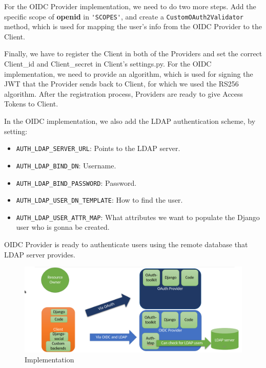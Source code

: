For the OIDC Provider implementation, we need to do two more steps. Add the specific scope of \textbf{openid} in \verb|'SCOPES'|, and create a \verb|CustomOAuth2Validator| method, which is used for mapping the user's info from the OIDC Provider to the Client. 



Finally, we have to register the Client in both of the Providers and set the correct Client\_id and Client\_secret in Client's settings.py. For the OIDC implementation, we need to provide an algorithm, which is used for signing the JWT that the Provider sends back to Client, for which we used the RS256 algorithm. After the registration process, Providers are ready to give Access Tokens to Client.

In the OIDC implementation, we also add the LDAP authentication scheme, by setting:

\begin{itemize}

	\item \verb|AUTH_LDAP_SERVER_URL|: Points to the LDAP server.

	\item \verb|AUTH_LDAP_BIND_DN|: Username.

	\item \verb|AUTH_LDAP_BIND_PASSWORD|: Password.

	\item \verb|AUTH_LDAP_USER_DN_TEMPLATE|: How to find the user.

	\item \verb|AUTH_LDAP_USER_ATTR_MAP|: What attributes we want to populate the Django user who is gonna be created.

\end{itemize}
OIDC Provider is ready to authenticate users using the remote database that LDAP server provides.


\begin{figure}[htb]
	\centering
	\hspace*{-2cm}
	\includegraphics[scale=0.5]{figures/implementation.png}
	\caption{Implementation}
\end{figure}

